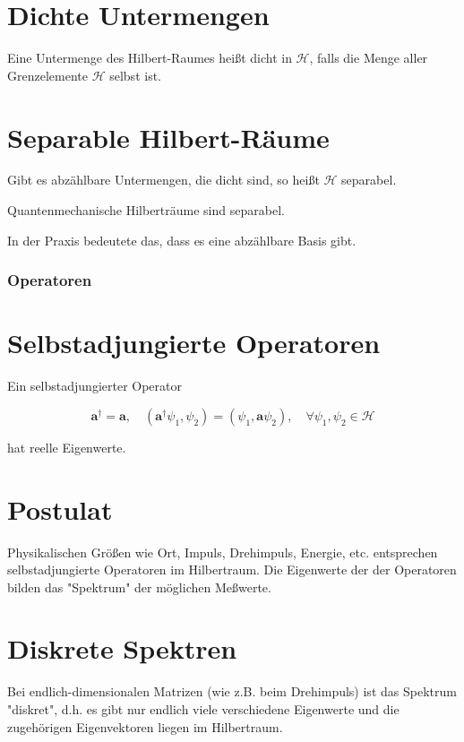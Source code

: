 \documentclass[10pt, letterpaper]{article}
\begin{document}
\section*{Dichte Untermengen}
Eine Untermenge des Hilbert-Raumes heißt dicht in $\mathcal{H}$, falls die Menge aller Grenzelemente $\mathcal{H}$ selbst ist.

\section*{Separable Hilbert-Räume}
Gibt es abzählbare Untermengen, die dicht sind, so heißt $\mathcal{H}$ separabel.

\begin{displayquote}
Quantenmechanische Hilberträume sind separabel.
\end{displayquote}

In der Praxis bedeutete das, dass es eine abzählbare Basis gibt.

\subsubsection*{Operatoren}
\section*{Selbstadjungierte Operatoren}
Ein selbstadjungierter Operator

$$
\mathbf{a}^{\dagger}=\mathbf{a}, \quad\left(\mathbf{a}^{\dagger} \psi_{1}, \psi_{2}\right)=\left(\psi_{1}, \mathbf{a} \psi_{2}\right), \quad \forall \psi_{1}, \psi_{2} \in \mathcal{H}
$$

hat reelle Eigenwerte.

\section*{Postulat}
Physikalischen Größen wie Ort, Impuls, Drehimpuls, Energie, etc. entsprechen selbstadjungierte Operatoren im Hilbertraum. Die Eigenwerte der der Operatoren bilden das "Spektrum" der möglichen Meßwerte.

\section*{Diskrete Spektren}
Bei endlich-dimensionalen Matrizen (wie z.B. beim Drehimpuls) ist das Spektrum "diskret", d.h. es gibt nur endlich viele verschiedene Eigenwerte und die zugehörigen Eigenvektoren liegen im Hilbertraum.
\end{document}
